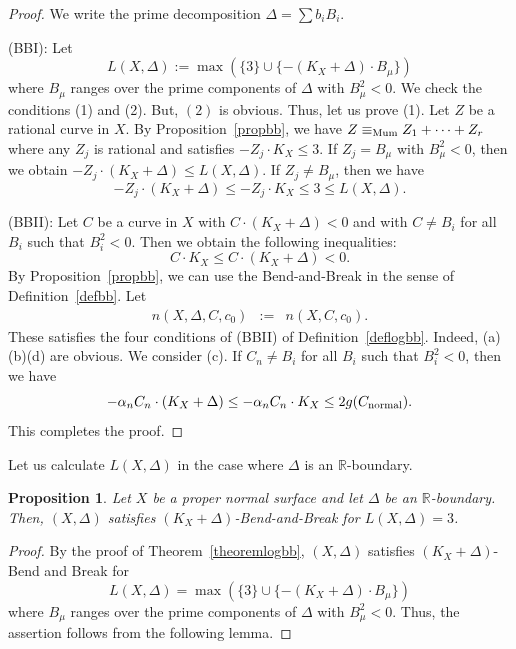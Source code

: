 \documentclass[12pt,twoside]{amsart}
\newtheorem{prop}[thm]{Proposition}
\theoremstyle{definition}
\begin{document}
\begin{proof}
We write the prime decomposition $\Delta=\sum{b_iB_i}$. 

(BBI):
Let 
$$L(X, \Delta):=\max(\{3\} \cup \{-(K_X+\Delta)\cdot B_{\mu}\})$$
where $B_{\mu}$ ranges over the prime components of $\Delta$ with $B_{\mu}^2<0.$ 
We check the conditions (1) and (2).
But, $(2)$ is obvious. 
Thus, let us prove (1). 
Let $Z$ be a rational curve in $X$. 
By Proposition~\ref{propbb}, 
we have $Z \equiv_{\rm Mum} Z_1+ \dots +Z_r$ 
where any $Z_j$ is rational and 
satisfies $-Z_j\cdot K_X \leq 3$. 
If $Z_j=B_{\mu}$ with $B_{\mu}^2<0$, 
then we obtain $-Z_j\cdot (K_X+\Delta) \leq L(X, \Delta)$. 
If $Z_j \neq B_{\mu}$, then we have 
$$-Z_j\cdot (K_X+\Delta) \leq -Z_j\cdot K_X \leq 3 \leq L(X, \Delta).$$

(BBII):
Let $C$ be a curve in $X$ with $C\cdot (K_X+\Delta)<0$ and 
with $C\neq B_i$ for all $B_i$ such that $B_i^2<0$. 
Then we obtain the following inequalities: 
$$C\cdot K_X \leq C\cdot (K_X+\Delta)<0.$$ 
By Proposition~\ref{propbb}, we can use the Bend-and-Break in the sense of Definition~\ref{defbb}. 
Let 
\begin{eqnarray*}
n(X, \Delta, C, c_0)&:=&n(X, C, c_0). 
\end{eqnarray*}
These satisfies the four conditions of (BBII) 
of Definition~\ref{deflogbb}. 
Indeed, (a)(b)(d) are obvious. 
We consider (c). 
If $C_n \neq B_i$ for all $B_i$ such that $B_i^2<0$, 
then we have 
$$-\alpha_nC_n\cdot (K_X+\Delta) \leq -\alpha_nC_n\cdot K_X 
\leq 2g(C_{\rm normal}).$$ 
This completes the proof. 
\end{proof}


Let us calculate $L(X, \Delta)$ in the case where $\Delta$ is an $\mathbb R$-boundary. 

\begin{prop}\label{bblength3}
Let $X$ be a proper normal surface 
and let $\Delta$ be an $\mathbb{R}$-boundary. 
Then, $(X, \Delta)$ satisfies $(K_X+\Delta)$-Bend-and-Break 
for $L(X, \Delta)=3$.
\end{prop}

\begin{proof}
By the proof of Theorem~\ref{theoremlogbb}, 
$(X, \Delta)$ satisfies $(K_X+\Delta)$-Bend and Break for 
$$L(X, \Delta)=\max(\{3\} \cup \{-(K_X+\Delta)\cdot B_{\mu}\})$$
where $B_{\mu}$ ranges over the prime components of $\Delta$ with $B_{\mu}^2<0.$ 
Thus, the assertion follows from the following lemma. 
\end{proof}
\end{document}
